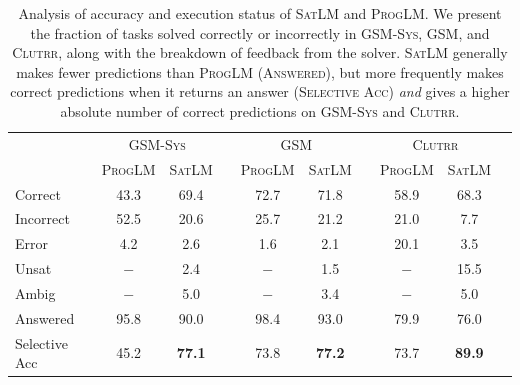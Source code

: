 \documentclass{article}
\theoremstyle{definition}
\newcommand{\gsm}{\textsc{GSM}}
\newcommand{\gsmsys}{\textsc{GSM-Sys}}
\newcommand{\clutrr}{\textsc{Clutrr}}
\newcommand{\satlm}{\textsc{SatLM}}
\newcommand{\pallm}{\textsc{ProgLM}}
\begin{document}
\begin{table}[t]
  \caption{Analysis of accuracy and execution status of \satlm{} and \pallm{}. We present the fraction of tasks solved correctly or incorrectly in \gsmsys{}, \gsm{}, and \clutrr{}, along with the breakdown of feedback from the solver. \satlm{} generally makes fewer predictions than \pallm{} (\textsc{Answered}), but more frequently makes correct predictions when it returns an answer (\textsc{Selective Acc}) \emph{and} gives a higher absolute number of correct predictions on \gsmsys{} and \clutrr{}.}
  \vspace{0.5em}
  \label{tab:exec_analysis}
  \scriptsize
  \renewcommand{\tabcolsep}{1.6mm}
  \centering
  \begin{tabular}{lccccccccc}
    \toprule
    & \multicolumn{2}{c}{\gsmsys{}} & & \multicolumn{2}{c}{\gsm{}} & & \multicolumn{2}{c}{\clutrr{}} \\
    & \pallm{} & \satlm{} & & \pallm{} & \satlm{} & & \pallm{} & \satlm{} \\
    \cmidrule{2-3}\cmidrule{5-6}\cmidrule{8-9}
    \sc Correct & 43.3 & 69.4 & & 72.7 & 71.8 & & 58.9 & 68.3\\
    \sc Incorrect & 52.5 & 20.6 & & 25.7 & 21.2 & & 21.0 & \phantom{0}7.7\\
     \cmidrule{1-1}
    \sc Error & \phantom{0}4.2 & \phantom{0}2.6 & & \phantom{0}1.6 & \phantom{0}2.1 & & 20.1 & \phantom{0}3.5\\
    \sc Unsat & $-$ & \phantom{0}2.4 & & $-$ & \phantom{0}1.5 & & $-$ & 15.5 \\
    \sc Ambig & $-$ & \phantom{0}5.0 & & $-$ & \phantom{0}3.4 & & $-$ & \phantom{0}5.0 \\
    \midrule
\sc Answered      & 95.8 & 90.0 & & 98.4 & 93.0 & &79.9 & 76.0\\
\sc Selective Acc & 45.2 & \bf 77.1 & & 73.8 & \bf 77.2& & 73.7 & \bf 89.9\\
    \bottomrule
  \end{tabular}
\end{table}
\end{document}
